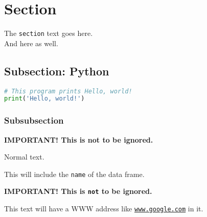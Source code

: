 \documentclass[10pt,a4paper]{hitec}
\newcommand{\imp}[1]{\textbf{\color{red} #1}}
\newcommand{\df}[1]{\colorbox{light-gray}{\texttt{#1}}}
\newcommand{\www}[1]{\colorbox{light-gray}{\texttt{\color{blue}#1}}}
\begin{document}
\newpage

\section{Section}

The \df{section} text goes here. \\ And here as well.

\subsection{Subsection: Python}

\begin{lstlisting}[language = Python]
# This program prints Hello, world!
print('Hello, world!')
\end{lstlisting}

\subsubsection{Subsubsection}

\imp{IMPORTANT! This is not to be ignored.} 

Normal text.

This will include the \df{name} of the data frame.

\imp{IMPORTANT! This is \df{not} to be ignored.} 

This text will have a WWW address like \www{\url{www.google.com}} in it.
\end{document}
